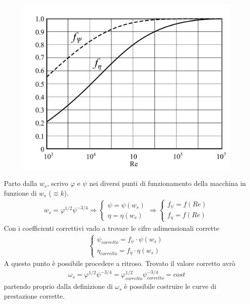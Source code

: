 \begin{figure}
\begin{minipage}{.6\textwidth}
  \centering
  \includegraphics[width=.95\linewidth]{fig/secondo_2.pdf}
  \label{fig:secondo_2}
\end{minipage}
\end{figure}

Parto dalla $w_s$, scrivo $\varphi$ e $\psi$ nei diversi punti di funzionamento della macchina in funzione di $w_s$ ($\equiv k$). 
\begin{align*}
w_s= \varphi^{1/2}\psi^{-3/4} \Rightarrow 
\begin{cases}
\psi = \psi(w_s)\\
\eta = \eta(w_s)
\end{cases}
\Rightarrow
\begin{cases}
f_{\psi} = f(Re)\\
f_{\eta} = f(Re)
\end{cases}
\end{align*}
Con i coefficienti correttivi vado a trovare le cifre adimensionali corrette \begin{align*}
\begin{cases}
\psi_{corretto} = f_{\psi} \cdot \psi(w_s)\\
\eta_{corretto} = f_{\eta} \cdot \eta(w_s)
\end{cases}
\end{align*}
A questo punto è possibile procedere a ritroso. Trovato il valore corretto avrò
\begin{align*}
\omega_s = \varphi^{1/2} \psi^{-3/4} =  \varphi_{corretto}^{1/2} \psi_{corretto}^{-3/4} = cost
\end{align*}
partendo proprio dalla definizione di $\omega_s$ è possibile costruire le curve di prestazione corrette.

